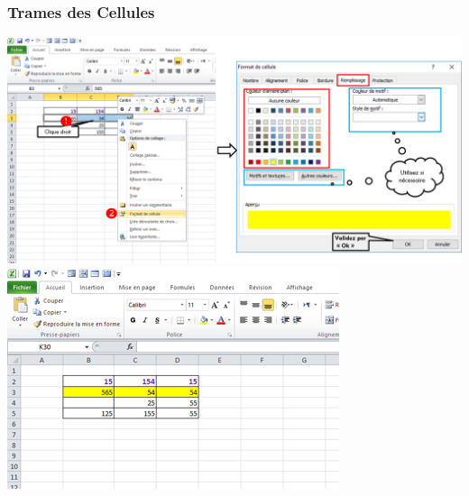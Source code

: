\subsubsection{Trames des Cellules}
\begin{center}  
	\includegraphics[scale=0.2,width= \linewidth]{img/trame_cellule}
	\includegraphics[scale=0.2,width= \linewidth]{img/trame_exemple}
\end{center}
